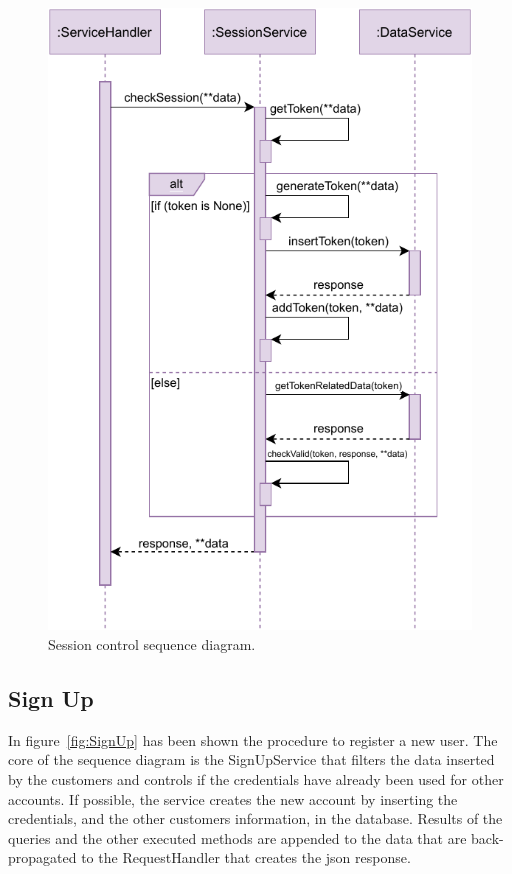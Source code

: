 \begin{figure}[H]
	\centering
	\includegraphics[width=1.0\textwidth]{images/sessionToken_sequence_diagram.pdf}
	\caption{Session control sequence diagram.}\label{fig:SessControl}
\end{figure}

\subsection{Sign Up}

In figure~\ref{fig:SignUp} has been shown the procedure to register a new user. The core of the sequence diagram is the SignUpService that filters the data inserted by the customers and controls if the credentials have already been used for other accounts. If possible, the service creates the new account by inserting the credentials, and the other customers information, in the database. Results of the queries and the other executed methods are appended to the data that are back-propagated to the RequestHandler that creates the \gls{json} response.

